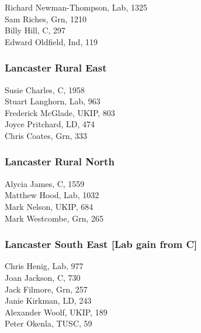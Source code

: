 \documentclass[a4paper,openany,10pt]{book}
\begin{document}


{Richard Newman-Thompson}, Lab, 1325\\
Sam Riches, Grn, 1210\\
Billy Hill, C, 297\\
Edward Oldfield, Ind, 119\\


\subsubsection*{Lancaster Rural East}



Susie Charles, C, 1958\\
Stuart Langhorn, Lab, 963\\
Frederick McGlade, UKIP, 803\\
Joyce Pritchard, LD, 474\\
Chris Coates, Grn, 333\\


\subsubsection*{Lancaster Rural North}



Alycia James, C, 1559\\
Matthew Hood, Lab, 1032\\
Mark Nelson, UKIP, 684\\
Mark Westcombe, Grn, 265\\


\subsubsection*{Lancaster South East \hspace*{\fill}\nolinebreak[1]%
\enspace\hspace*{\fill}
[Lab gain from C]}



Chris Henig, Lab, 977\\
Joan Jackson, C, 730\\
Jack Filmore, Grn, 257\\
Janie Kirkman, LD, 243\\
Alexander Woolf, UKIP, 189\\
Peter Okenla, TUSC, 59\\
\end{document}
